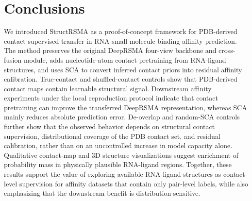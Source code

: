 \documentclass[journal=jcisd8,manuscript=article]{achemso}
\begin{document}
\section{Conclusions}

We introduced StructRSMA as a proof-of-concept framework for PDB-derived contact-supervised transfer in RNA-small molecule binding affinity prediction. The method preserves the original DeepRSMA four-view backbone and cross-fusion module, adds nucleotide-atom contact pretraining from RNA-ligand structures, and uses SCA to convert inferred contact priors into residual affinity calibration. True-contact and shuffled-contact controls show that PDB-derived contact maps contain learnable structural signal. Downstream affinity experiments under the local reproduction protocol indicate that contact pretraining can improve the transferred DeepRSMA representation, whereas SCA mainly reduces absolute prediction error. De-overlap and random-SCA controls further show that the observed behavior depends on structural contact supervision, distributional coverage of the PDB contact set, and residual calibration, rather than on an uncontrolled increase in model capacity alone. Qualitative contact-map and 3D structure visualizations suggest enrichment of probability mass in physically plausible RNA-ligand regions. Together, these results support the value of exploring available RNA-ligand structures as contact-level supervision for affinity datasets that contain only pair-level labels, while also emphasizing that the downstream benefit is distribution-sensitive.


\end{document}
